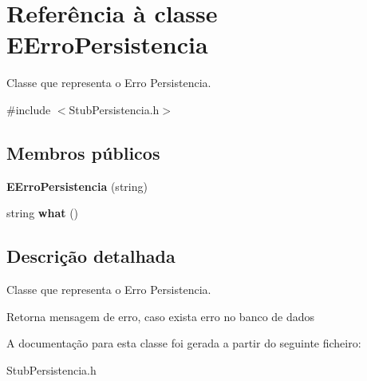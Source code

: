 \hypertarget{class_e_erro_persistencia}{
\section{\-Referência à classe \-E\-Erro\-Persistencia}
\label{class_e_erro_persistencia}
}


\-Classe que representa o \-Erro \-Persistencia.  




{\ttfamily \#include $<$\-Stub\-Persistencia.\-h$>$}

\subsection*{\-Membros públicos}
\begin{DoxyCompactItemize}
\item 
\hypertarget{class_e_erro_persistencia_ad97950abf99eb7383b4c4d8d3f51d818}{
{\bfseries \-E\-Erro\-Persistencia} (string)}
\label{class_e_erro_persistencia_ad97950abf99eb7383b4c4d8d3f51d818}

\item 
\hypertarget{class_e_erro_persistencia_a3701f04bc5fe594f78955e9fa6a6501f}{
string {\bfseries what} ()}
\label{class_e_erro_persistencia_a3701f04bc5fe594f78955e9fa6a6501f}

\end{DoxyCompactItemize}


\subsection{\-Descrição detalhada}
\-Classe que representa o \-Erro \-Persistencia. 

\-Retorna mensagem de erro, caso exista erro no banco de dados 

\-A documentação para esta classe foi gerada a partir do seguinte ficheiro\-:\begin{DoxyCompactItemize}
\item 
\-Stub\-Persistencia.\-h\end{DoxyCompactItemize}
